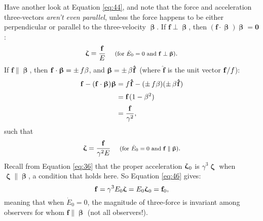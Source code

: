\documentclass[12pt]{article}
\newcommand{\abs}[1]{\mathnormal \vv{#1}}
\renewcommand{\vv}[1]{\mathbf{#1}}
\newcommand{\vvbeta}{\bm{\upbeta}}
\newcommand{\vvzeta}{\bm{\upzeta}}
\begin{document}
Have another look at Equation \ref{eq:44}, and note that the force and acceleration three-vectors \emph{aren't even parallel}, unless the force happens to be either perpendicular or parallel to the three-velocity $\vvbeta$. If $\vv f \perp \vvbeta$, then $(\vv f \cdot \vvbeta) \vvbeta = \vv 0$:
\begin{equation}\label{eq:45}
\vvzeta = \frac{\vv f}{E} \quad \textrm{\footnotesize{ (for $\dot{E}_0 = 0$ and $\vv f \perp \vvbeta$)}}.
\end{equation}
If $\vv f \parallel \vvbeta$, then $\vv f \cdot \vvbeta = \pm \, \abs f \beta$, and $\vvbeta = \pm \, \beta \mkern1mu \vv{\hat{f}}$ (where $\vv{\hat{f}}$ is the unit vector $\vv f / \abs f$):
\begin{equation*}
\begin{split}
\vv f - (\vv f \cdot \vvbeta) \vvbeta &= \abs f \mkern1mu \vv{\hat{f}} - (\pm \, \abs f \beta) (\pm \, \beta \mkern1mu \vv{\hat{f}}) \\[2pt]
&= \vv f \mkern1mu (1 - \beta^2) \\[2pt]
&= \frac{\vv f}{\gamma^2},
\end{split}
\end{equation*}
such that
\begin{equation}\label{eq:46}
\vvzeta = \frac{\vv f}{\gamma^2 E} \quad \textrm{\footnotesize{ (for $\dot{E}_0 = 0$ and $\vv f \parallel \vvbeta$)}}.
\end{equation}
Recall from Equation \ref{eq:36} that the proper acceleration $\vvzeta_{\mkern1mu 0}$ is $\gamma^3 \vvzeta$ when $\vvzeta \parallel \vvbeta$, a condition that holds here. So Equation \ref{eq:46} gives:
\begin{equation*}
\vv f = \gamma^3 E_0 \vvzeta = E_0 \vvzeta_{\mkern1mu 0} = \vv f_0 ,
\end{equation*}
meaning that when $\dot{E}_0 = 0$, the magnitude of three-force is invariant among observers for whom $\vv f \parallel \vvbeta$ (not all observers!).
\end{document}
